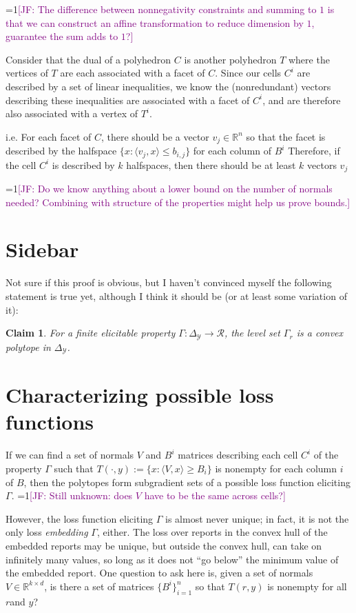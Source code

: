 \documentclass[12pt]{article}
\newcommand{\Comments}{1}
\newcommand{\mynote}[2]{\ifnum\Comments=1\textcolor{#1}{#2}\fi}
\newcommand{\jessie}[1]{\mynote{purple}{[JF: #1]}}
\newcommand{\reals}{\mathbb{R}}
\newcommand{\R}{\mathcal{R}}
\newcommand{\Y}{\mathcal{Y}}
\newcommand{\inprod}[2]{\langle #1, #2 \rangle}
\newcommand{\simplex}{\Delta_\Y}
\newtheorem{claim}{Claim}
\begin{document}
\jessie{The difference between nonnegativity constraints and summing to $1$ is that we can construct an affine transformation to reduce dimension by $1$, guarantee the sum adds to $1$?}

Consider that the dual of a polyhedron $C$ is another polyhedron $T$ where the vertices of $T$ are each associated with a facet of $C$.
Since our cells $C^i$ are described by a set of linear inequalities, we know the (nonredundant) vectors describing these inequalities are associated with a facet of $C^i$, and are therefore also associated with a vertex of $T^i$.


i.e. For each facet of $C$, there should be a vector $v_j \in \reals^n$ so that the facet is described by the halfspace $\{x : \inprod{v_j}{x} \leq b_{i,j} \}$ for each column of $B^i$ 
Therefore, if the cell $C^i$ is described by $k$ halfspaces, then there should be at least $k$ vectors $v_j$

\jessie{Do we know anything about a lower bound on the number of normals needed?  Combining with structure of the properties might help us prove bounds.}

\section{Sidebar}
Not sure if this proof is obvious, but I haven't convinced myself the following statement is true yet, although I think it should be (or at least some variation of it):
\begin{claim}
For a finite elicitable property $\Gamma: \simplex\to\R$, the level set $\Gamma_r$ is a convex polytope in $\simplex$.
\end{claim}

\section{Characterizing possible loss functions}
If we can find a set of normals $V$ and $B^i$ matrices describing each cell $C^i$ of the property $\Gamma$ such that $T(\cdot, y) := \{x : \inprod{V}{x} \geq B_{i} \}$ is nonempty for each column $i$ of $B$, then the polytopes form subgradient sets of a possible loss function eliciting $\Gamma$.
\jessie{Still unknown: does $V$ have to be the same across cells?}

However, the loss function eliciting $\Gamma$ is almost never unique; in fact, it is not the only loss \emph{embedding} $\Gamma$, either.
The loss over reports in the convex hull of the embedded reports may be unique, but outside the convex hull, can take on infinitely many values, so long as it does not ``go below'' the minimum value of the embedded report.
One question to ask here is, given a set of normals $V \in \reals^{k \times d}$, is there a set of matrices $\{B^i\}_{i=1}^{n}$ so that $T(r,y)$ is nonempty for all $r$and $y$?
\end{document}
